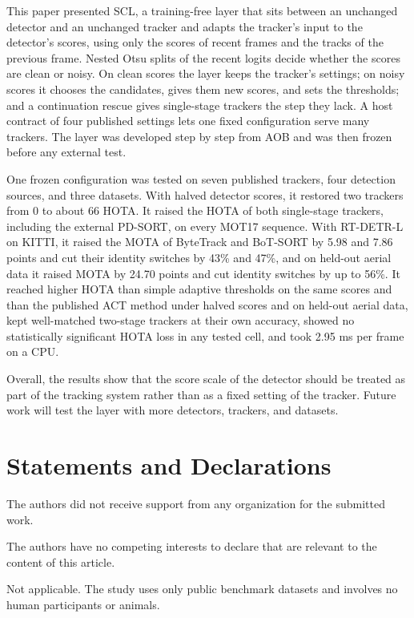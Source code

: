 \documentclass[pdflatex,sn-mathphys-num,iicol]{sn-jnl}
\newcommand{\scl}{SCL}
\newcommand{\aob}{AOB}
\begin{document}
This paper presented \scl{}, a training-free layer that sits between an unchanged detector and an
unchanged tracker and adapts the tracker's input to the detector's scores, using only the scores of
recent frames and the tracks of the previous frame. Nested Otsu splits of the recent logits decide
whether the scores are clean or noisy. On clean scores the layer keeps the tracker's settings; on
noisy scores it chooses the candidates, gives them new scores, and sets the thresholds; and a
continuation rescue gives single-stage trackers the step they lack. A host contract of four
published settings lets one fixed configuration serve many trackers. The layer was developed step
by step from \aob{} and was then frozen before any external test.

One frozen configuration was tested on seven published trackers, four detection sources, and three
datasets. With halved detector scores, it restored two trackers from 0 to about 66 HOTA. It raised
the HOTA of both single-stage trackers, including the external PD-SORT, on every MOT17 sequence.
With RT-DETR-L on KITTI, it raised the MOTA of ByteTrack and BoT-SORT by 5.98 and 7.86 points and
cut their identity switches by 43\% and 47\%, and on held-out aerial data it raised MOTA by 24.70
points and cut identity switches by up to 56\%. It reached higher HOTA than simple adaptive
thresholds on the same scores and than the published ACT method under halved scores and on
held-out aerial data, kept well-matched two-stage trackers at their own accuracy, showed no
statistically significant HOTA loss in any tested cell, and took 2.95 ms per frame on a CPU.

Overall, the results show that the score scale of the detector should be treated as part of the
tracking system rather than as a fixed setting of the tracker. Future work will test the layer with
more detectors, trackers, and datasets.

\backmatter

\section*{Statements and Declarations}

The authors did not receive support from any organization for the submitted work.

The authors have no competing interests to declare that are relevant to the content of this
article.

Not applicable. The study uses only public benchmark datasets and involves no human participants
or animals.
\end{document}
